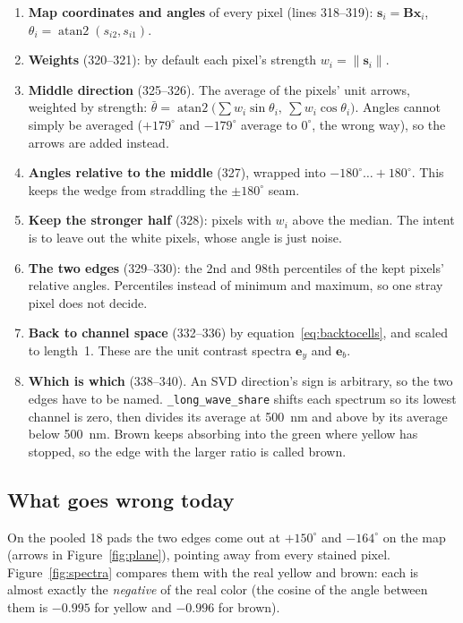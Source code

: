 \documentclass[11pt,letterpaper]{article}
\newcommand{\code}[1]{\texttt{#1}}
\newcommand{\vx}{\mathbf{x}}
\newcommand{\vs}{\mathbf{s}}
\newcommand{\ey}{\mathbf{e}_y}
\newcommand{\eb}{\mathbf{e}_b}
\newcommand{\mB}{\mathbf{B}}
\begin{document}
\begin{enumerate}
\item \textbf{Map coordinates and angles} of every pixel (lines 318--319):
  $\vs_i = \mB\vx_i$, $\theta_i = \operatorname{atan2}(s_{i2}, s_{i1})$.
\item \textbf{Weights} (320--321): by default each pixel's strength
  $w_i = \|\vs_i\|$.
\item \textbf{Middle direction} (325--326).  The average of the pixels'
  unit arrows, weighted by strength:
  $\bar\theta = \operatorname{atan2}\bigl(\sum w_i\sin\theta_i,\ \sum
  w_i\cos\theta_i\bigr)$.  Angles cannot simply be averaged ($+179^\circ$
  and $-179^\circ$ average to $0^\circ$, the wrong way), so the arrows are
  added instead.
\item \textbf{Angles relative to the middle} (327), wrapped into
  $-180^\circ\dots+180^\circ$.  This keeps the wedge from straddling the
  $\pm180^\circ$ seam.
\item \textbf{Keep the stronger half} (328): pixels with $w_i$ above the
  median.  The intent is to leave out the white pixels, whose angle is just
  noise.
\item \textbf{The two edges} (329--330): the 2nd and 98th percentiles of the
  kept pixels' relative angles.  Percentiles instead of minimum and maximum,
  so one stray pixel does not decide.
\item \textbf{Back to channel space} (332--336) by
  equation~\eqref{eq:backtocells}, and scaled to length~1.  These are the
  unit contrast spectra $\ey$ and $\eb$.
\item \textbf{Which is which} (338--340).  An SVD direction's sign is
  arbitrary, so the two edges have to be named.  \code{\_long\_wave\_share}
  shifts each spectrum so its lowest channel is zero, then divides its
  average at 500~nm and above by its average below 500~nm.  Brown keeps
  absorbing into the green where yellow has stopped, so the edge with the
  larger ratio is called brown.
\end{enumerate}

\subsection{What goes wrong today}
\label{sec:endmembersfail}

On the pooled 18 pads the two edges come out at $+150^\circ$ and
$-164^\circ$ on the map (arrows in Figure~\ref{fig:plane}), pointing away
from every stained pixel.  Figure~\ref{fig:spectra} compares them with the
real yellow and brown: each is almost exactly the \emph{negative} of the
real color (the cosine of the angle between them is $-0.995$ for yellow and
$-0.996$ for brown).
\end{document}
